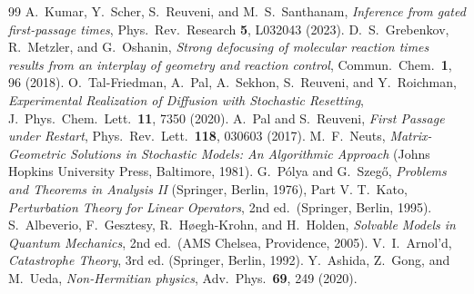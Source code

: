 \documentclass[reprint,amsmath,amssymb,aps,prresearch,longbibliography]{revtex4-2}
\begin{document}
\begin{thebibliography}{99}
 A.~Kumar, Y.~Scher, S.~Reuveni, and M.~S.~Santhanam, \emph{Inference from gated first-passage times}, Phys.\ Rev.\ Research \textbf{5}, L032043 (2023).
 D.~S.~Grebenkov, R.~Metzler, and G.~Oshanin, \emph{Strong defocusing of molecular reaction times results from an interplay of geometry and reaction control}, Commun.\ Chem.\ \textbf{1}, 96 (2018).
 O.~Tal-Friedman, A.~Pal, A.~Sekhon, S.~Reuveni, and Y.~Roichman, \emph{Experimental Realization of Diffusion with Stochastic Resetting}, J.\ Phys.\ Chem.\ Lett.\ \textbf{11}, 7350 (2020).
 A.~Pal and S.~Reuveni, \emph{First Passage under Restart}, Phys.\ Rev.\ Lett.\ \textbf{118}, 030603 (2017).
 M.~F.~Neuts, \emph{Matrix-Geometric Solutions in Stochastic Models: An Algorithmic Approach} (Johns Hopkins University Press, Baltimore, 1981).
 G.~P\'olya and G.~Szeg\H{o}, \emph{Problems and Theorems in Analysis II} (Springer, Berlin, 1976), Part V.
 T.~Kato, \emph{Perturbation Theory for Linear Operators}, 2nd ed.\ (Springer, Berlin, 1995).
 S.~Albeverio, F.~Gesztesy, R.~H{\o}egh-Krohn, and H.~Holden, \emph{Solvable Models in Quantum Mechanics}, 2nd ed.\ (AMS Chelsea, Providence, 2005).
 V.~I.~Arnol'd, \emph{Catastrophe Theory}, 3rd ed. (Springer, Berlin, 1992).
 Y.~Ashida, Z.~Gong, and M.~Ueda, \emph{Non-Hermitian physics}, Adv.\ Phys.\ \textbf{69}, 249 (2020).
\end{thebibliography}
\end{document}
